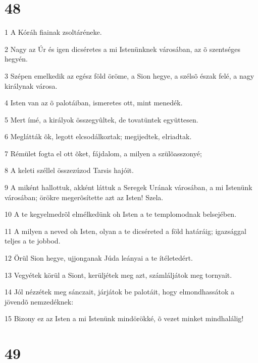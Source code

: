 \chapter{48}

\par 1 A Kóráh fiainak zsoltáréneke.
\par 2 Nagy az Úr és igen dicséretes a mi Istenünknek városában, az õ szentséges hegyén.
\par 3 Szépen emelkedik az egész föld öröme, a Sion hegye, a szélsõ észak felé, a nagy királynak városa.
\par 4 Isten van az õ palotáiban, ismeretes ott, mint menedék.
\par 5 Mert ímé, a királyok összegyûltek, de tovatüntek együttesen.
\par 6 Meglátták õk, legott elcsodálkoztak; megijedtek, elriadtak.
\par 7 Rémület fogta el ott õket, fájdalom, a milyen a szülõasszonyé;
\par 8 A keleti széllel összezúzod Tarsis hajóit.
\par 9 A miként hallottuk, akként láttuk a Seregek Urának városában, a mi Istenünk városában; örökre megerõsítette azt az Isten! Szela.
\par 10 A te kegyelmedrõl elmélkedünk oh Isten a te templomodnak belsejében.
\par 11 A milyen a neved oh Isten, olyan a te dicséreted a föld határáig; igazsággal teljes a te jobbod.
\par 12 Örül Sion hegye, ujjonganak Júda leányai a te ítéletedért.
\par 13 Vegyétek körül a Siont, kerüljétek meg azt, számláljátok meg tornyait.
\par 14 Jól nézzétek meg sánczait, járjátok be palotáit, hogy elmondhassátok a jövendõ nemzedéknek:
\par 15 Bizony ez az Isten a mi Istenünk mindörökké, õ vezet minket mindhalálig!

\chapter{49}

